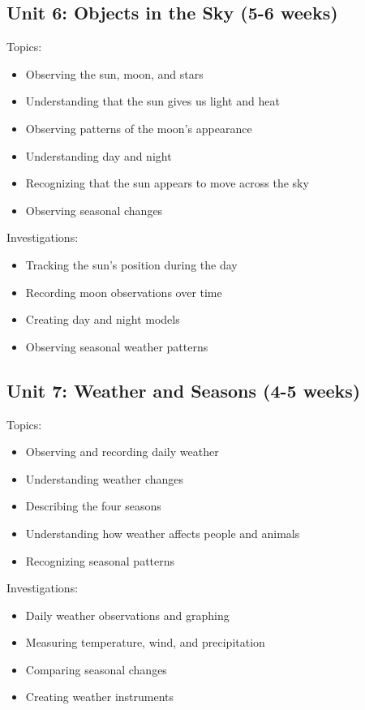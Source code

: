 \documentclass[11pt,letterpaper]{report}
\begin{document}
\subsection{Unit 6: Objects in the Sky (5-6 weeks)}

Topics:
\begin{itemize}
\item Observing the sun, moon, and stars
\item Understanding that the sun gives us light and heat
\item Observing patterns of the moon's appearance
\item Understanding day and night
\item Recognizing that the sun appears to move across the sky
\item Observing seasonal changes
\end{itemize}

Investigations:
\begin{itemize}
\item Tracking the sun's position during the day
\item Recording moon observations over time
\item Creating day and night models
\item Observing seasonal weather patterns
\end{itemize}

\subsection{Unit 7: Weather and Seasons (4-5 weeks)}

Topics:
\begin{itemize}
\item Observing and recording daily weather
\item Understanding weather changes
\item Describing the four seasons
\item Understanding how weather affects people and animals
\item Recognizing seasonal patterns
\end{itemize}

Investigations:
\begin{itemize}
\item Daily weather observations and graphing
\item Measuring temperature, wind, and precipitation
\item Comparing seasonal changes
\item Creating weather instruments
\end{itemize}
\end{document}
